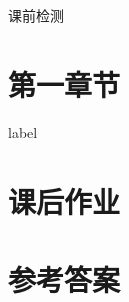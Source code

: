 \Topic{}
  \Teach{}
  \newtheorem*{Theorem}{定理}
  \makefront
\vspace{-1.5em}
\startexercise
\begin{exercise}{\heiti 课前检测}\\
\end{exercise}
\section{第一章节}
  \begin{description}
    \item [label]
  \end{description}
  \begin{exercise}
    \item
  \end{exercise}

\newpage
\section{课后作业}
  \begin{exercise}

  \end{exercise}
\stopexercise

\newpage
\section{参考答案}
\printanswer
